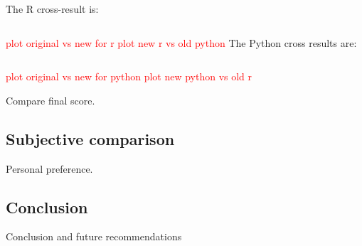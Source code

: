 \documentclass{article}
\begin{document}
The R cross-result is:
\begin{verbatim}

\end{verbatim}
\textcolor{red}{plot original vs new for r}
\textcolor{red}{plot new r vs old python}
The Python cross results are:
\begin{verbatim}

\end{verbatim}
\textcolor{red}{plot original vs new for python}
\textcolor{red}{plot new python vs old r}

Compare final score.

\subsection{Subjective comparison}
Personal preference.
\subsection{Conclusion}
Conclusion and future recommendations

\newpage
\end{document}
